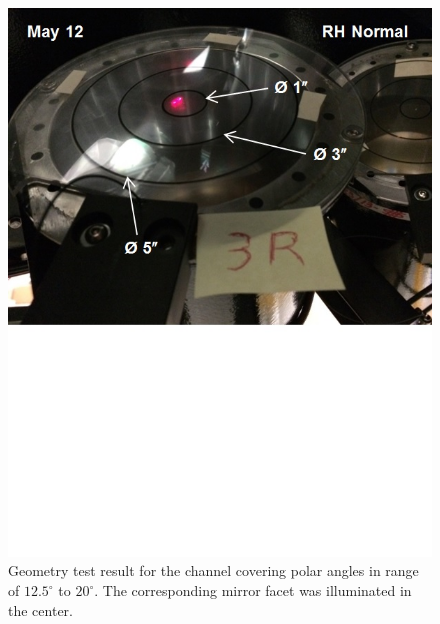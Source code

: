 \begin{figure}[ht]
    \centering
    \includegraphics[width=1.0\linewidth,trim={0 8.5cm 0 0},clip]{images/GEO_TEST_3_Normal.jpg}
    \caption{Geometry test result for the channel covering polar angles in range of $12.5^\circ$ to $20^\circ$. The corresponding mirror facet was illuminated in the center.}
    \label{fig:GEO_TEST_3_Normal}
\end{figure}

